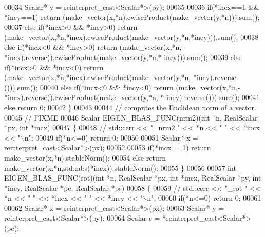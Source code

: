 \begin{DoxyCode}
00034   Scalar* y = \textcolor{keyword}{reinterpret\_cast<}Scalar*\textcolor{keyword}{>}(py);
00035 
00036   \textcolor{keywordflow}{if}(*incx==1 && *incy==1)    \textcolor{keywordflow}{return} (make\_vector(x,*n).cwiseProduct(make\_vector(y,*n))).sum();
00037   \textcolor{keywordflow}{else} \textcolor{keywordflow}{if}(*incx>0 && *incy>0) \textcolor{keywordflow}{return} (make\_vector(x,*n,*incx).cwiseProduct(make\_vector(y,*n,*incy))).sum();
00038   \textcolor{keywordflow}{else} \textcolor{keywordflow}{if}(*incx<0 && *incy>0) \textcolor{keywordflow}{return} (make\_vector(x,*n,-*incx).reverse().cwiseProduct(make\_vector(y,*n,*
      incy))).sum();
00039   \textcolor{keywordflow}{else} \textcolor{keywordflow}{if}(*incx>0 && *incy<0) \textcolor{keywordflow}{return} (make\_vector(x,*n,*incx).cwiseProduct(make\_vector(y,*n,-*incy).reverse
      ())).sum();
00040   \textcolor{keywordflow}{else} \textcolor{keywordflow}{if}(*incx<0 && *incy<0) \textcolor{keywordflow}{return} (make\_vector(x,*n,-*incx).reverse().cwiseProduct(make\_vector(y,*n,-*
      incy).reverse())).sum();
00041   \textcolor{keywordflow}{else} \textcolor{keywordflow}{return} 0;
00042 \}
00043 
00044 \textcolor{comment}{// computes the Euclidean norm of a vector.}
00045 \textcolor{comment}{// FIXME}
00046 Scalar EIGEN\_BLAS\_FUNC(nrm2)(\textcolor{keywordtype}{int} *n, RealScalar *px, \textcolor{keywordtype}{int} *incx)
00047 \{
00048 \textcolor{comment}{//   std::cerr << "\_nrm2 " << *n << " " << *incx << "\(\backslash\)n";}
00049   \textcolor{keywordflow}{if}(*n<=0) \textcolor{keywordflow}{return} 0;
00050 
00051   Scalar* x = \textcolor{keyword}{reinterpret\_cast<}Scalar*\textcolor{keyword}{>}(px);
00052 
00053   \textcolor{keywordflow}{if}(*incx==1)  \textcolor{keywordflow}{return} make\_vector(x,*n).stableNorm();
00054   \textcolor{keywordflow}{else}          \textcolor{keywordflow}{return} make\_vector(x,*n,std::abs(*incx)).stableNorm();
00055 \}
00056 
00057 \textcolor{keywordtype}{int} EIGEN\_BLAS\_FUNC(rot)(\textcolor{keywordtype}{int} *n, RealScalar *px, \textcolor{keywordtype}{int} *incx, RealScalar *py, \textcolor{keywordtype}{int} *incy, RealScalar *pc, 
      RealScalar *ps)
00058 \{
00059 \textcolor{comment}{//   std::cerr << "\_rot " << *n << " " << *incx << " " << *incy << "\(\backslash\)n";}
00060   \textcolor{keywordflow}{if}(*n<=0) \textcolor{keywordflow}{return} 0;
00061 
00062   Scalar* x = \textcolor{keyword}{reinterpret\_cast<}Scalar*\textcolor{keyword}{>}(px);
00063   Scalar* y = \textcolor{keyword}{reinterpret\_cast<}Scalar*\textcolor{keyword}{>}(py);
00064   Scalar c = *\textcolor{keyword}{reinterpret\_cast<}Scalar*\textcolor{keyword}{>}(pc);

\end{DoxyCode}
